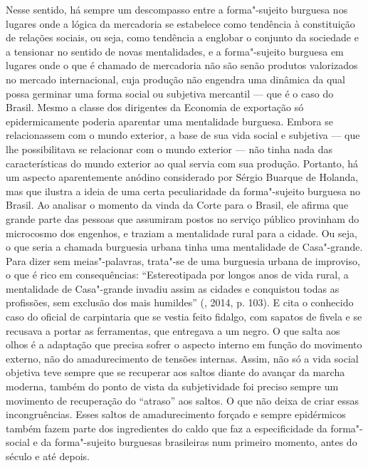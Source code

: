 Nesse sentido, há sempre um descompasso entre a forma"-sujeito burguesa
nos lugares onde a lógica da mercadoria se estabelece como tendência à
constituição de relações sociais, ou seja, como tendência a englobar o
conjunto da sociedade e a tensionar no sentido de novas mentalidades, e
a forma"-sujeito burguesa em lugares onde o que é chamado de mercadoria
não são senão produtos valorizados no mercado internacional, cuja
produção não engendra uma dinâmica da qual possa germinar uma forma
social ou subjetiva mercantil --- que é o caso do Brasil. Mesmo a classe
dos dirigentes da Economia de exportação só epidermicamente poderia
aparentar uma mentalidade burguesa. Embora se relacionassem com o mundo
exterior, a base de sua vida social e subjetiva --- que lhe possibilitava
se relacionar com o mundo exterior --- não tinha nada das características
do mundo exterior ao qual servia com sua produção. Portanto, há um
aspecto aparentemente anódino considerado por Sérgio Buarque de Holanda,
mas que ilustra a ideia de uma certa peculiaridade da forma"-sujeito
burguesa no Brasil. Ao analisar o momento da vinda da Corte para o
Brasil, ele afirma que grande parte das pessoas que assumiram postos no
serviço público provinham do microcosmo dos engenhos, e traziam a
mentalidade rural para a cidade. Ou seja, o que seria a chamada
burguesia urbana tinha uma mentalidade de Casa"-grande. Para dizer sem
meias"-palavras, trata"-se de uma burguesia urbana de improviso, o que é
rico em consequências: ``Estereotipada por longos anos de vida rural, a
mentalidade de Casa"-grande invadiu assim as cidades e conquistou todas
as profissões, sem exclusão dos mais humildes'' (, 2014, p. 103).
E cita o conhecido caso do oficial de carpintaria que se vestia feito
fidalgo, com sapatos de fivela e se recusava a portar as ferramentas,
que entregava a um negro. O que salta aos olhos é a adaptação que
precisa sofrer o aspecto interno em função do movimento externo, não do
amadurecimento de tensões internas. Assim, não só a vida social objetiva
teve sempre que se recuperar aos saltos diante do avançar da marcha
moderna, também do ponto de vista da subjetividade foi preciso sempre um
movimento de recuperação do ``atraso'' aos saltos. O que não deixa de
criar essas incongruências. Esses saltos de amadurecimento forçado e
sempre epidérmicos também fazem parte dos ingredientes do caldo que faz
a especificidade da forma"-social e da forma"-sujeito burguesas
brasileiras num primeiro momento, antes do século  e até depois.

